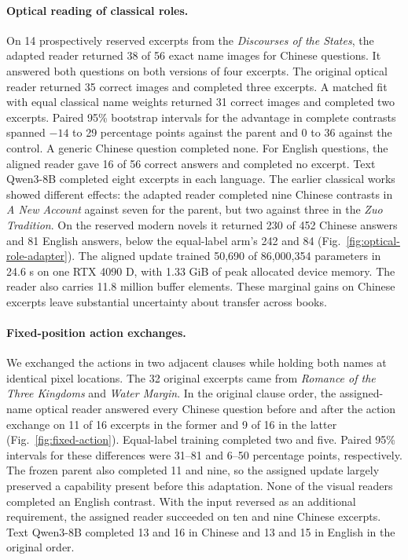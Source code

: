 \documentclass[12pt,a4paper]{article}
\providecommand{\DIFadd}[1]{{\protect\color{blue} \sf #1}} %
\begin{document}
\paragraph{\DIFadd{Optical reading of classical roles.}}
\DIFadd{On 14 prospectively reserved excerpts from the \textit{Discourses of the States}, the adapted reader returned 38 of 56 exact name images for Chinese questions. It answered both questions on both versions of four excerpts. The original optical reader returned 35 correct images and completed three excerpts. A matched fit with equal classical name weights returned 31 correct images and completed two excerpts. Paired 95\% bootstrap intervals for the advantage in complete contrasts spanned $-14$ to 29 percentage points against the parent and 0 to 36 against the control. A generic Chinese question completed none. For English questions, the aligned reader gave 16 of 56 correct answers and completed no excerpt. Text Qwen3-8B completed eight excerpts in each language. The earlier classical works showed different effects: the adapted reader completed nine Chinese contrasts in \textit{A New Account} against seven for the parent, but two against three in the \textit{Zuo Tradition}. On the reserved modern novels it returned 230 of 452 Chinese answers and 81 English answers, below the equal-label arm's 242 and 84 (Fig.~\ref{fig:optical-role-adapter}). The aligned update trained 50,690 of 86,000,354 parameters in 24.6 s on one RTX 4090 D, with 1.33 GiB of peak allocated device memory. The reader also carries 11.8 million buffer elements. These marginal gains on Chinese excerpts leave substantial uncertainty about transfer across books.
}

\paragraph{\DIFadd{Fixed-position action exchanges.}}
\DIFadd{We exchanged the actions in two adjacent clauses while holding both names at identical pixel locations. The 32 original excerpts came from \textit{Romance of the Three Kingdoms} and \textit{Water Margin}. In the original clause order, the assigned-name optical reader answered every Chinese question before and after the action exchange on 11 of 16 excerpts in the former and 9 of 16 in the latter (Fig.~\ref{fig:fixed-action}). Equal-label training completed two and five. Paired 95\% intervals for these differences were 31--81 and 6--50 percentage points, respectively. The frozen parent also completed 11 and nine, so the assigned update largely preserved a capability present before this adaptation. None of the visual readers completed an English contrast. With the input reversed as an additional requirement, the assigned reader succeeded on ten and nine Chinese excerpts. Text Qwen3-8B completed 13 and 16 in Chinese and 13 and 15 in English in the original order.
}
\end{document}
